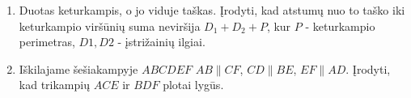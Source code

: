 \begin{enumerate}
\item Duotas keturkampis, o jo viduje taškas. Įrodyti, kad
  atstumų nuo to taško iki keturkampio viršūnių suma
  neviršija $D_1 + D_2 + P$, kur $P$ - keturkampio
  perimetras, $D1, D2$ - įstrižainių ilgiai.
\item Iškilajame šešiakampyje $ABCDEF$ $AB\parallel{CF}$,
  $CD\parallel{BE}$, $EF\parallel{AD}$. Įrodyti, kad
  trikampių $ACE$ ir $BDF$ plotai lygūs.

\end{enumerate}
